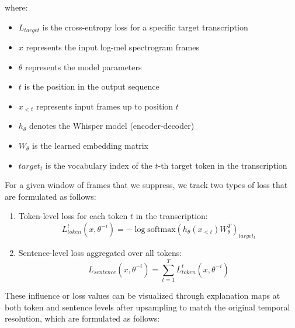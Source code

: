\documentclass[../report.tex]{subfiles}
\begin{document}
    where:
    \begin{itemize}
    \item $L_{target}$ is the cross-entropy loss for a specific target transcription
    \item $x$ represents the input log-mel spectrogram frames
    \item $\theta$ represents the model parameters
    \item $t$ is the position in the output sequence
    \item $x_{<t}$ represents input frames up to position $t$
    \item $h_\theta$ denotes the Whisper model (encoder-decoder)
    \item $W_\theta$ is the learned embedding matrix
    \item $target_t$ is the vocabulary index of the $t$-th target token in the transcription
    \end{itemize}

    For a given window of frames that we suppress, we track two types of loss that are formulated as follows:

    \begin{enumerate}
        \item Token-level loss for each token $t$ in the transcription:
        \begin{equation}
            L^t_{token}(x, \theta^{-i}) = -\log \text{softmax}(h_\theta(x_{<t})W^T_\theta)_{target_t}
        \end{equation}

        \item Sentence-level loss aggregated over all tokens:
        \begin{equation}
            L_{sentence}(x, \theta^{-i}) = \sum_{t=1}^{T} L^t_{token}(x, \theta^{-i})
        \end{equation}
    \end{enumerate}



    These influence or loss values can be visualized through explanation maps at both token and sentence levels after upsampling to match the original temporal resolution, which are formulated as follows:
\end{document}
